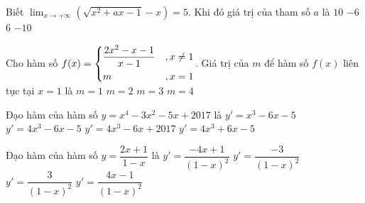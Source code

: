 \begin{ex}%
	Biết $\displaystyle\lim_{x\rightarrow +\infty}\left(\sqrt{x^2+ax-1}-x\right)=5$. Khi đó giá trị của tham số $a$ là
	\choice
	{\True $10$}
	{$-6$}
	{$6$}
	{$-10$}
\end{ex}

\begin{ex}%
	Cho hàm số $f(x)=\left\{\begin{aligned}&\dfrac{2x^2-x-1}{x-1}&,x\neq1\\&m&,x=1\end{aligned}\right.$. Giá trị của $m$ để hàm số $f(x)$ liên tục tại $x=1$ là
	\choice
	{$m=1$}
	{$m=2$}
	{\True$m=3$}
	{$m=4$}
\end{ex}

\begin{ex}%
	Đạo hàm của hàm số $y=x^4-3x^2-5x+2017$ là
	\choice
	{$y'=x^3-6x-5$}
	{\True $y'=4x^3-6x-5$}
	{$y'=4x^3-6x+2017$}
	{$y'=4x^3+6x-5$}
\end{ex}
\begin{ex}%
	Đạo hàm của hàm số $y=\dfrac{2x+1}{1-x}$ là	
	\choice
	{$y'=\dfrac{-4x+1}{(1-x)^2}$}
	{$y'=\dfrac{-3}{(1-x)^2}$}
	{\True $y'=\dfrac{3}{(1-x)^2}$}
	{ $y'=\dfrac{4x-1}{(1-x)^2}$}
\end{ex}

